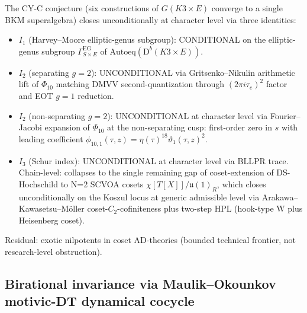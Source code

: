 \documentclass[11pt]{article}
\begin{document}
The CY-C conjecture (six constructions of $G(K3 \times E)$ converge
to a single BKM superalgebra) closes unconditionally at character
level via three identities:
\begin{itemize}
\item $I_1$ (Harvey--Moore elliptic-genus subgroup): CONDITIONAL on
the elliptic-genus subgroup $\Gamma^{\mathrm{EG}}_{S \times E}$ of
$\mathrm{Autoeq}(\mathrm{D}^b(K3 \times E))$.
\item $I_2$ (separating $g=2$): UNCONDITIONAL via Gritsenko--Nikulin
arithmetic lift of $\Phi_{10}$ matching DMVV second-quantization
through $(2\pi i \tau_e)^2$ factor and EOT $g=1$ reduction.
\item $I_2$ (non-separating $g=2$): UNCONDITIONAL at character level
via Fourier--Jacobi expansion of $\Phi_{10}$ at the non-separating
cusp: first-order zero in $s$ with leading coefficient
$\phi_{10,1}(\tau, z) = \eta(\tau)^{18}\vartheta_1(\tau, z)^2$.
\item $I_3$ (Schur index): UNCONDITIONAL at character level via
BLLPR trace. Chain-level: collapses to the single remaining gap
of coset-extension of DS-Hochschild to N=2 SCVOA cosets
$\chi[T[X]]/\mathfrak{u}(1)_R$, which closes unconditionally on
the Koszul locus at generic admissible level via Arakawa--Kawasetsu--Möller
coset-$C_2$-cofiniteness plus two-step HPL (hook-type W plus
Heisenberg coset).
\end{itemize}
Residual: exotic nilpotents in coset AD-theories (bounded technical
frontier, not research-level obstruction).

\subsection{Birational invariance via Maulik--Okounkov motivic-DT dynamical cocycle}
\end{document}
